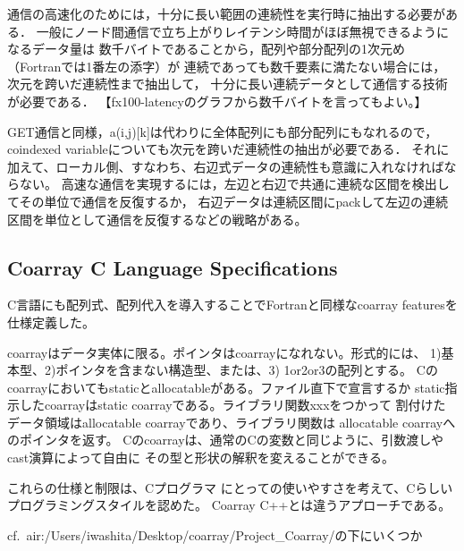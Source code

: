 \requirement
通信の高速化のためには，十分に長い範囲の連続性を実行時に抽出する必要がある．
一般にノード間通信で立ち上がりレイテンシ時間がほぼ無視できるようになるデータ量は
数千バイトであることから，配列や部分配列の1次元め（Fortranでは1番左の添字）が
連続であっても数千要素に満たない場合には，次元を跨いだ連続性まで抽出して，
十分に長い連続データとして通信する技術が必要である．
【fx100-latencyのグラフから数千バイトを言ってもよい。】

GET通信と同様，a(i,j)[k]は代わりに全体配列にも部分配列にもなれるので，
coindexed variableについても次元を跨いだ連続性の抽出が必要である．
それに加えて、ローカル側、すなわち、右辺式データの連続性も意識に入れなければならない。
高速な通信を実現するには，左辺と右辺で共通に連続な区間を検出してその単位で通信を反復するか，
右辺データは連続区間にpackして左辺の連続区間を単位として通信を反復するなどの戦略がある。



\subsection{Coarray C Language Specifications}

C言語にも配列式、配列代入を導入することでFortranと同様なcoarray featuresを仕様定義した。

coarrayはデータ実体に限る。ポインタはcoarrayになれない。形式的には、
1)基本型、2)ポインタを含まない構造型、または、3) 1or2or3の配列とする。
Cのcoarrayにおいてもstaticとallocatableがある。ファイル直下で宣言するか
static指示したcoarrayはstatic coarrayである。ライブラリ関数xxxをつかって
割付けたデータ領域はallocatable coarrayであり、ライブラリ関数は
allocatable coarrayへのポインタを返す。
Cのcoarrayは、通常のCの変数と同じように、引数渡しやcast演算によって自由に
その型と形状の解釈を変えることができる。

これらの仕様と制限は、Cプログラマ
にとっての使いやすさを考えて、Cらしいプログラミングスタイルを認めた。
Coarray C++とは違うアプローチである。

cf.\ air:/Users/iwashita/Desktop/coarray/Project\_Coarray/の下にいくつか
